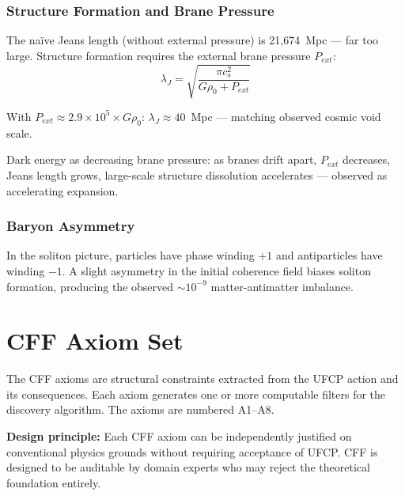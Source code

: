 \documentclass[11pt, a4paper]{article}
\begin{document}
\section{Structure Formation and Brane Pressure}

The na\"ive Jeans length (without external pressure) is
21,674~Mpc --- far too large. Structure formation requires the
external brane pressure $P_{ext}$:
\begin{equation}
  \lambda_J = \sqrt{\frac{\pi c_s^2}{G\rho_0 + P_{ext}}}
\end{equation}

With $P_{ext} \approx 2.9 \times 10^5 \times G\rho_0$:
$\lambda_J \approx 40$~Mpc --- matching observed cosmic void scale.

Dark energy as decreasing brane pressure: as branes drift apart,
$P_{ext}$ decreases, Jeans length grows, large-scale structure
dissolution accelerates --- observed as accelerating expansion.

\section{Baryon Asymmetry}

In the soliton picture, particles have phase winding $+1$ and
antiparticles have winding $-1$. A slight asymmetry in the initial
coherence field biases soliton formation, producing the observed
$\sim 10^{-9}$ matter-antimatter imbalance.

\newpage

\part{CFF Axiom Set}

The CFF axioms are structural constraints extracted from the UFCP
action and its consequences. Each axiom generates one or more
computable filters for the discovery algorithm. The axioms are
numbered A1--A8.

\textbf{Design principle:} Each CFF axiom can be independently
justified on conventional physics grounds without requiring
acceptance of UFCP. CFF is designed to be auditable by domain
experts who may reject the theoretical foundation entirely.
\end{document}
